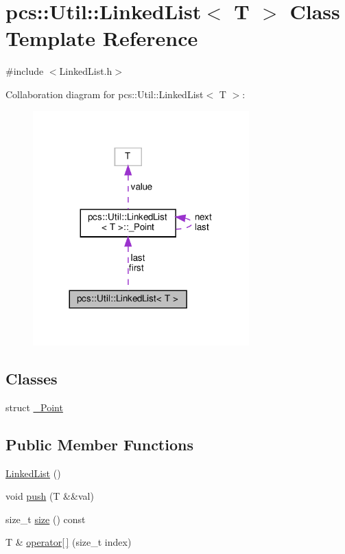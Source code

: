 \hypertarget{classpcs_1_1Util_1_1LinkedList}{}\section{pcs\+:\+:Util\+:\+:Linked\+List$<$ T $>$ Class Template Reference}
\label{classpcs_1_1Util_1_1LinkedList}


{\ttfamily \#include $<$Linked\+List.\+h$>$}



Collaboration diagram for pcs\+:\+:Util\+:\+:Linked\+List$<$ T $>$\+:\nopagebreak
\begin{figure}[H]
\begin{center}
\leavevmode
\includegraphics[width=236pt]{classpcs_1_1Util_1_1LinkedList__coll__graph}
\end{center}
\end{figure}
\subsection*{Classes}
\begin{DoxyCompactItemize}
\item 
struct \hyperlink{structpcs_1_1Util_1_1LinkedList_1_1__Point}{\+\_\+\+Point}
\end{DoxyCompactItemize}
\subsection*{Public Member Functions}
\begin{DoxyCompactItemize}
\item 
\hyperlink{classpcs_1_1Util_1_1LinkedList_ac57e454c23a32aac315f04cd2923224a}{Linked\+List} ()
\item 
void \hyperlink{classpcs_1_1Util_1_1LinkedList_a79ddaedb4fbd61886c4326a9a9c34c5d}{push} (T \&\&val)
\item 
size\+\_\+t \hyperlink{classpcs_1_1Util_1_1LinkedList_ac778698256b41a8085d3654056a4093a}{size} () const
\item 
T \& \hyperlink{classpcs_1_1Util_1_1LinkedList_a6d9fcadd0150b4d8ff679923a6e2852f}{operator\mbox{[}$\,$\mbox{]}} (size\+\_\+t index)
\end{DoxyCompactItemize}
